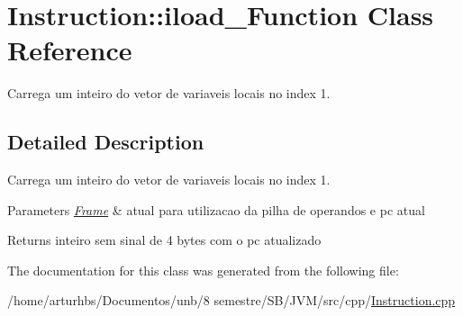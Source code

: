 \hypertarget{classInstruction_1_1iload__1Function}{}\section{Instruction\+:\+:iload\+\_\+Function Class Reference}
\label{classInstruction_1_1iload__1Function}


Carrega um inteiro do vetor de variaveis locais no index 1.  




\subsection{Detailed Description}
Carrega um inteiro do vetor de variaveis locais no index 1. 


\begin{DoxyParams}{Parameters}
{\em \hyperlink{classFrame}{Frame}} & atual para utilizacao da pilha de operandos e pc atual \\
\hline
\end{DoxyParams}
\begin{DoxyReturn}{Returns}
inteiro sem sinal de 4 bytes com o pc atualizado 
\end{DoxyReturn}


The documentation for this class was generated from the following file\+:\begin{DoxyCompactItemize}
\item 
/home/arturhbs/\+Documentos/unb/8 semestre/\+S\+B/\+J\+V\+M/src/cpp/\hyperlink{Instruction_8cpp}{Instruction.\+cpp}\end{DoxyCompactItemize}
